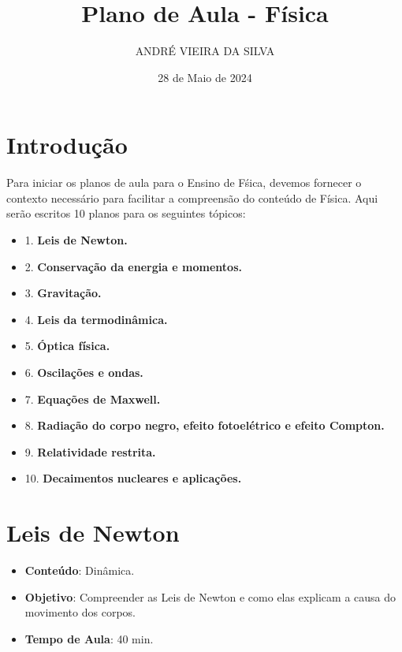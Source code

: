\documentclass[a4paper,12pt]{article}
\title{ \textbf{\large Plano de Aula - F\'isica}}
\author{ANDRÉ VIEIRA DA SILVA}
\date{28 de Maio de 2024}
\begin{document}
\maketitle

%
%
%
%
%
\tableofcontents
\newpage


\section*{Introdu\c{c}\~ao}
\hspace{0.5cm}Para iniciar os planos de aula para o Ensino de F\'sica,
devemos fornecer o contexto necess\'ario para facilitar a compreens\~ao
do conte\'udo de F\'isica. Aqui ser\~ao escritos 10 planos para os 
seguintes t\'opicos:

\begin{itemize}

    \item 1. \bf{Leis de Newton.}
    \item 2. \bf{Conservação da energia e momentos. }
    \item 3. \bf{Gravitação. }
    \item 4. \bf{Leis da termodinâmica. }
    \item 5. \bf{Óptica física. }
    \item 6. \bf{Oscilações e ondas.} 
    \item 7. \bf{Equações de Maxwell.} 
    \item 8. \bf{Radiação do corpo negro, efeito fotoelétrico e efeito Compton. }
    \item 9. \bf{Relatividade restrita. }
    \item 10. \bf{Decaimentos nucleares e aplicações.}
\end{itemize}

\newpage
\section{Leis de Newton}
\begin{itemize}
\item \textbf{Conte\'udo}: Din\^amica.
\item \textbf{Objetivo}: Compreender as Leis de Newton e como elas explicam a causa
do movimento dos corpos.
\item \textbf{Tempo de Aula}: 40 min.
\end{itemize}
\end{document}
